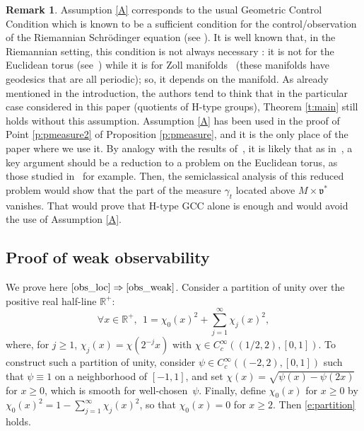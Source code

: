 \documentclass[10pt]{amsart}
\theoremstyle{plain}
\theoremstyle{definition}
\newtheorem{remark}[theorem]{Remark}
\def\R{{\mathbb R}}
\begin{document}
\begin{remark} \label{r:assumpA}
Assumption \eqref{A} corresponds to the usual Geometric Control Condition which is known to be a sufficient condition for the control/observation of the Riemannian Schrödinger equation (see \cite{Leb}). It is well known that, in the Riemannian setting, this condition is not always necessary : it is not for the Euclidean torus (see~\cite{J,AM14,BZ}) while it is for Zoll manifolds~\cite{Mac11} (these manifolds have geodesics that are all periodic); so, it depends on the manifold. As already mentioned in the introduction, the authors tend to think that in the particular case considered in this paper (quotients of H-type groups), Theorem \ref{t:main} still holds without this assumption. Assumption \eqref{A} has been used in the proof of Point \eqref{p:pmeasure2} of Proposition \ref{p:pmeasure}, and it is the only place of the paper where we use it. By analogy with the results of~\cite{AM14,AFM15,BS}, it is likely that as in~\cite[\S 7]{BS}, a key argument should be a reduction to a problem on the Euclidean torus, as those studied in~\cite{AFM15} for example. Then, the semiclassical analysis of this reduced problem would show that the part of the measure $\gamma_t$ located above $M\times {\mathfrak v}^*$ vanishes. That would prove that H-type GCC alone is enough and would avoid the use of Assumption \eqref{A}.
\end{remark}

\subsection{Proof of weak observability}\label{s:weakobs}

We prove here  $\eqref{obs_loc} \Rightarrow\eqref{obs_weak}$.
Consider a partition of unity over the positive real half-line $\R^+$:
\begin{equation} \label{e:partition}
\forall x\in\R^+, \ \ 1=\chi_0(x)^2+\sum_{j=1}^\infty \chi_j(x)^2,
\end{equation}
where, for $j\geq1$, $\chi_j(x)=\chi(2^{-j}x)$ with $\chi\in C_c^\infty((1/2,2),[0,1])$. To construct such a partition of unity, consider $\psi\in C_c^\infty((-2,2),[0,1])$ such that $\psi\equiv 1$ on a neighborhood of $[-1,1]$, and set $\chi(x)=\sqrt{\psi(x)-\psi(2x)}$ for $x\geq 0$, which is smooth for well-chosen~$\psi$. Finally, define $\chi_0(x)$ for $x\geq 0$ by $\chi_0(x)^2=1-\sum_{j=1}^\infty \chi_j(x)^2$, so that $\chi_0(x)=0$ for $x\geq 2$. Then \eqref{e:partition} holds.
\end{document}
